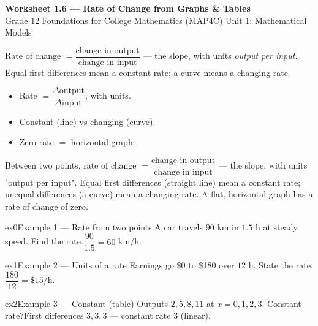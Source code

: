 \documentclass[11pt]{article}
\begin{document}
\begin{center}
{\LARGE\bfseries\color{titleblue}Worksheet 1.6 --- Rate of Change from Graphs \& Tables}\\[2pt]
{\small Grade 12 Foundations for College Mathematics (MAP4C) \textperiodcentered{} Unit 1: Mathematical Models}
\end{center}

\begin{ideabox}
Rate of change $=\dfrac{\text{change in output}}{\text{change in input}}$ — the slope, with units \emph{output per input}. Equal first differences mean a constant rate; a curve means a changing rate.
\begin{itemize}[leftmargin=*,itemsep=2pt]
  \item Rate $=\dfrac{\Delta\text{output}}{\Delta\text{input}}$, with units.
  \item Constant (line) vs changing (curve).
  \item Zero rate $=$ horizontal graph.
\end{itemize}
\end{ideabox}

\begin{learnbox}
Between two points, rate of change $=\dfrac{\text{change in output}}{\text{change in input}}$ — the slope, with units "output per input".
Equal first differences (straight line) mean a constant rate; unequal differences (a curve) mean a changing rate.
A flat, horizontal graph has a rate of change of zero.
\end{learnbox}


\begin{example}{ex0}{Example 1 --- Rate from two points}
A car travels $90$ km in $1.5$ h at steady speed. Find the rate.\soln $\dfrac{90}{1.5}=60$ km/h.
\end{example}

\begin{example}{ex1}{Example 2 --- Units of a rate}
Earnings go \$0 to \$180 over $12$ h. State the rate.\soln $\dfrac{180}{12}=\$15$/h.
\end{example}

\begin{example}{ex2}{Example 3 --- Constant (table)}
Outputs $2,5,8,11$ at $x=0,1,2,3$. Constant rate?\soln First differences $3,3,3$ — constant rate $3$ (linear).
\end{example}
\end{document}
